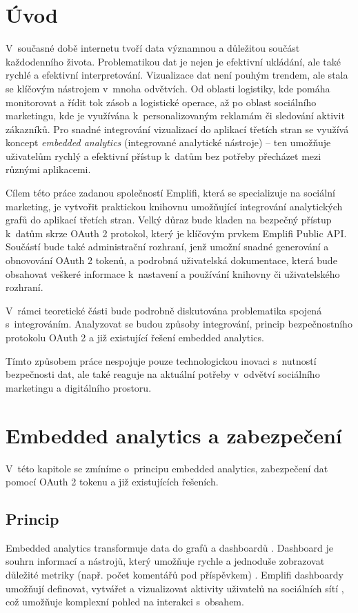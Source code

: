 \documentclass[czech, bc, kiv, he, iso690numb]{fasthesis}
\begin{document}
\chapter{Úvod}
V~současné době internetu tvoří data významnou a důležitou součást každodenního života. Problematikou dat je nejen je efektivní ukládání, 
ale také rychlé a efektivní interpretování. 
Vizualizace dat není pouhým trendem, ale stala se klíčovým nástrojem v~mnoha odvětvích. Od oblasti logistiky, kde pomáha monitorovat a řídit tok zásob a logistické operace, až po oblast sociálního marketingu, kde je využívána k~personalizovaným reklamám či sledování aktivit zákazníků. 
Pro snadné integrování vizualizací do aplikací třetích stran se využívá koncept \textit{embedded analytics} (integrované analytické nástroje) – ten umožňuje uživatelům rychlý a efektivní přístup k~datům bez potřeby přecházet mezi různými aplikacemi. 

Cílem této práce zadanou společností Emplifi, která se specializuje na sociální marketing, je vytvořit praktickou knihovnu umožňující integrování analytických grafů do aplikací třetích stran. 
Velký důraz bude kladen na bezpečný přístup k~datům skrze OAuth 2 protokol, který je klíčovým prvkem Emplifi Public API. Součástí bude také administrační rozhraní, jenž umožní snadné generování a obnovování OAuth 2 tokenů, a podrobná uživatelská dokumentace, která bude obsahovat veškeré informace k~nastavení a používání knihovny či uživatelského rozhraní.

V~rámci teoretické části bude podrobně diskutována problematika spojená s~integrováním. Analyzovat se budou způsoby integrování, princip bezpečnostního protokolu OAuth 2 a již existující řešení embedded analytics.

Tímto způsobem práce nespojuje pouze technologickou inovaci s~nutností bezpečnosti dat, ale také reaguje na aktuální potřeby v~odvětví sociálního marketingu a digitálního prostoru.
%
%
%
%
\chapter{Embedded analytics a zabezpečení}
V~této kapitole se zmíníme o~principu embedded analytics, zabezpečení dat pomocí OAuth 2 tokenu a již existujících řešeních.

%
%
\section{Princip}
Embedded analytics transformuje data do grafů a dashboardů \cite{goodDataEmbedded}. Dashboard je souhrn informací a nástrojů, který umožňuje rychle a jednoduše zobrazovat důležité metriky (např. počet komentářů pod příspěvkem) \cite{coJeDashboard}.
Emplifi dashboardy umožňují definovat, vytvářet a vizualizovat aktivity uživatelů na sociálních sítí \cite{emplifiDashboard}, což umožňuje komplexní pohled na interakci s~obsahem.
\end{document}
